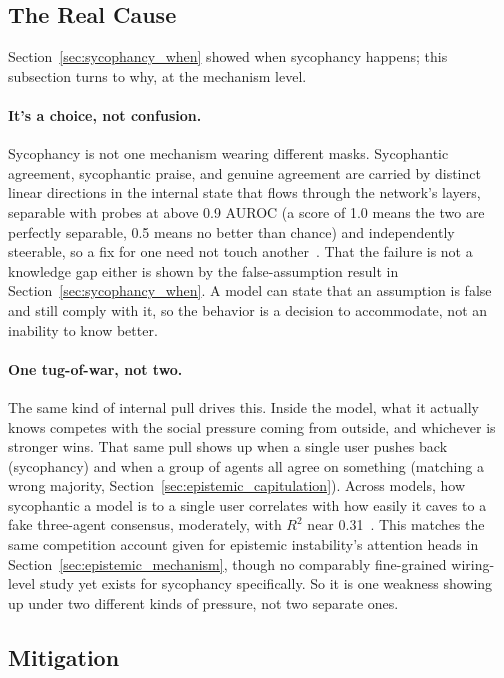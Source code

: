 \subsection{The Real Cause}
\label{sec:sycophancy_mechanism}

Section~\ref{sec:sycophancy_when} showed when sycophancy happens; this subsection turns to why, at the mechanism level.

\paragraph{It's a choice, not confusion.} Sycophancy is not one mechanism wearing different masks. Sycophantic agreement, sycophantic praise, and genuine agreement are carried by distinct linear directions in the internal state that flows through the network's layers, separable with probes at above 0.9 AUROC (a score of 1.0 means the two are perfectly separable, 0.5 means no better than chance) and independently steerable, so a fix for one need not touch another~\citep{SycophancyIsNotOne_Vennemeyer}. That the failure is not a knowledge gap either is shown by the false-assumption result in Section~\ref{sec:sycophancy_when}. A model can state that an assumption is false and still comply with it, so the behavior is a decision to accommodate, not an inability to know better.

\paragraph{One tug-of-war, not two.} The same kind of internal pull drives this. Inside the model, what it actually knows competes with the social pressure coming from outside, and whichever is stronger wins. That same pull shows up when a single user pushes back (sycophancy) and when a group of agents all agree on something (matching a wrong majority, Section~\ref{sec:epistemic_capitulation}). Across models, how sycophantic a model is to a single user correlates with how easily it caves to a fake three-agent consensus, moderately, with $R^2$ near 0.31~\citep{HumanLikeSocialCompliance_Zhang}. This matches the same competition account given for epistemic instability's attention heads in Section~\ref{sec:epistemic_mechanism}, though no comparably fine-grained wiring-level study yet exists for sycophancy specifically. So it is one weakness showing up under two different kinds of pressure, not two separate ones.

\subsection{Mitigation}
\label{sec:sycophancy_mitigation}

